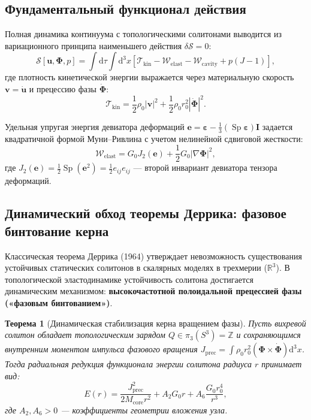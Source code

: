 \documentclass[12pt,a4paper]{article}
\newtheorem{theorem}{Теорема}[section]
\theoremstyle{definition}
\theoremstyle{remark}
\begin{document}
\subsection{Фундаментальный функционал действия}
Полная динамика континуума с топологическими солитонами выводится из вариационного принципа наименьшего действия $\delta \mathcal{S} = 0$:
\begin{equation}
	\mathcal{S}[\mathbf{u}, \boldsymbol{\Phi}, p] = \int \mathrm{d}\tau \int \mathrm{d}^3 x \left[ \mathcal{T}_{\mathrm{kin}} - \mathcal{W}_{\mathrm{elast}} - \mathcal{W}_{\mathrm{cavity}} + p(J - 1) \right],
	\label{eq:action_total}
\end{equation}
где плотность кинетической энергии выражается через материальную скорость $\mathbf{v} = \dot{\mathbf{u}}$ и прецессию фазы $\dot{\boldsymbol{\Phi}}$:
\begin{equation}
	\mathcal{T}_{\mathrm{kin}} = \frac{1}{2}\rho_0 |\mathbf{v}|^2 + \frac{1}{2}\rho_0 r_0^2 |\dot{\boldsymbol{\Phi}}|^2.
	\label{eq:kinetic_energy}
\end{equation}

Удельная упругая энергия девиатора деформаций $\mathbf{e} = \boldsymbol{\varepsilon} - \frac{1}{3}(\operatorname{Sp}\boldsymbol{\varepsilon})\mathbf{I}$ задается квадратичной формой Муни--Ривлина с учетом нелинейной сдвиговой жесткости:
\begin{equation}
	\mathcal{W}_{\mathrm{elast}} = G_0 J_2(\mathbf{e}) + \frac{1}{2} G_0 |\nabla \boldsymbol{\Phi}|^2,
	\label{eq:elastic_energy}
\end{equation}
где $J_2(\mathbf{e}) = \frac{1}{2}\operatorname{Sp}(\mathbf{e}^2) = \frac{1}{2} e_{ij} e_{ij}$ --- второй инвариант девиатора тензора деформаций.

\subsection{Динамический обход теоремы Деррика: фазовое бинтование керна}
Классическая теорема Деррика (1964) утверждает невозможность существования устойчивых статических солитонов в скалярных моделях в трехмерии ($\mathbb{R}^3$). В топологической эластодинамике устойчивость солитона достигается динамическим механизмом: \textbf{высокочастотной полоидальной прецессией фазы («фазовым бинтованием»)}.

\begin{theorem}[Динамическая стабилизация керна вращением фазы]
	Пусть вихревой солитон обладает топологическим зарядом $Q \in \pi_3(S^3) = \mathbb{Z}$ и сохраняющимся внутренним моментом импульса фазового вращения $J_{\mathrm{prec}} = \int \rho_0 r_0^2 (\boldsymbol{\Phi} \times \dot{\boldsymbol{\Phi}}) \mathrm{d}^3 x$. Тогда радиальная редукция функционала энергии солитона радиуса $r$ принимает вид:
	\begin{equation}
		E(r) = \frac{J_{\mathrm{prec}}^2}{2 M_{\mathrm{core}} r^2} + A_2 G_0 r + A_6 \frac{G_0 r_0^4}{r^3},
		\label{eq:derrick_balance}
	\end{equation}
	где $A_2, A_6 > 0$ --- коэффициенты геометрии вложения узла.
\end{theorem}
\end{document}
